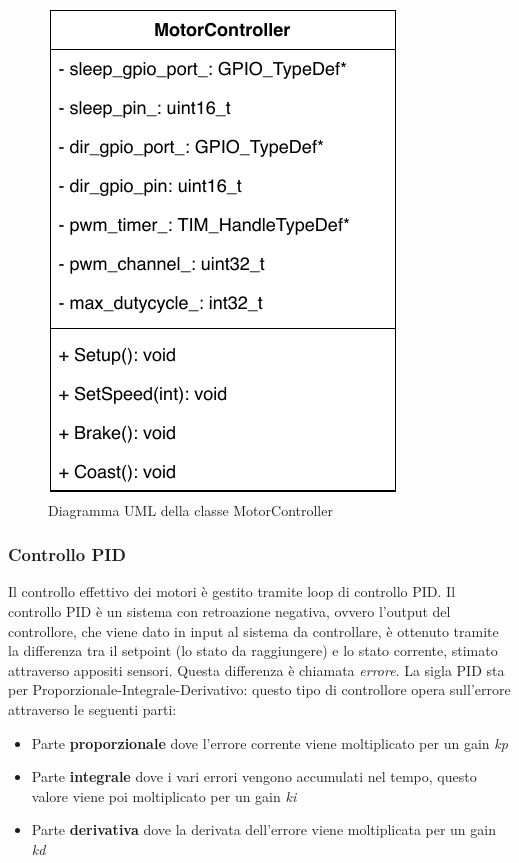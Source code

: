 \begin{figure}[ht]
    \centering
    \includegraphics[scale=0.80]{images/motorcontroller_class.pdf}
    \caption{Diagramma UML della classe MotorController}
    \label{fig:motorcontroller_class}
\end{figure}

\subsubsection{Controllo PID}

Il controllo effettivo dei motori è gestito tramite loop di controllo PID. 
Il controllo PID è un sistema con retroazione negativa, ovvero l'output del controllore, che viene dato in input al sistema da controllare, è ottenuto tramite la differenza tra il setpoint (lo stato da raggiungere) e lo stato corrente, stimato attraverso appositi sensori. Questa differenza è chiamata \textit{errore}.
La sigla PID sta per Proporzionale-Integrale-Derivativo: questo tipo di controllore opera sull'errore attraverso le seguenti parti:
\begin{itemize}
    \item Parte \textbf{proporzionale} dove l'errore corrente viene moltiplicato per un gain \textit{kp}
    \item Parte \textbf{integrale} dove i vari errori vengono accumulati nel tempo, questo valore viene poi moltiplicato per un gain \textit{ki}
    \item Parte \textbf{derivativa} dove la derivata dell'errore viene moltiplicata per un gain \textit{kd}
\end{itemize}


